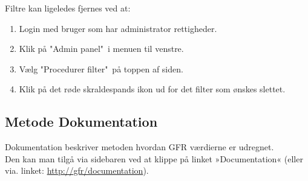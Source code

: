 \documentclass{article}
\begin{document}
Filtre kan ligeledes fjernes ved at:
\begin{enumerate}
	\item Login med bruger som har administrator rettigheder.
	\item Klik på "Admin panel"\ i menuen til venstre.
	\item Vælg "Procedurer filter"\ på toppen af siden.
	\item Klik på det røde skraldespands ikon ud for det filter som ønskes slettet.
\end{enumerate}

\subsection{Metode Dokumentation}\label{Documentation}
Dokumentation beskriver metoden hvordan GFR værdierne er udregnet.\\ 
Den kan man tilgå via sidebaren ved at klippe på linket »Documentation« (eller via. linket: \url{http://gfr/documentation}). 
\end{document}
